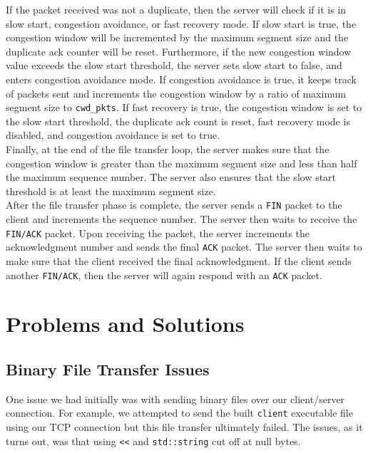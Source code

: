 \documentclass{article}
\begin{document}
\noindent
If the packet received was not a duplicate, then the server will check if it is in slow start, congestion avoidance, or fast recovery mode. If slow start is true, the congestion window will be incremented by the maximum segment size and the duplicate ack counter will be reset. Furthermore, if the new congestion window value exceeds the slow start threshold, the server sets slow start to false, and enters congestion avoidance mode. If congestion avoidance is true, it keeps track of packets sent and increments the congestion window by a ratio of maximum segment size to \texttt{cwd\_pkts}. If fast recovery is true, the congestion window is set to the slow start threshold, the duplicate ack count is reset, fast recovery mode is disabled, and congestion avoidance is set to true. \\

\noindent
Finally, at the end of the file transfer loop, the server makes sure that the congestion window is greater than the maximum segment size and less than half the maximum sequence number. The server also ensures that the slow start threshold is at least the maximum segment size. \\

\noindent
After the file transfer phase is complete, the server sends a \texttt{FIN} packet to the client and increments the sequence number. The server then waits to receive the \texttt{FIN/ACK} packet. Upon receiving the packet, the server increments the acknowledgment number and sends the final \texttt{ACK} packet. The server then waits to make sure that the client received the final acknowledgment. If the client sends another \texttt{FIN/ACK}, then the server will again respond with an \texttt{ACK} packet.

\section{Problems and Solutions}

\subsection{Binary File Transfer Issues}

One issue we had initially was with sending binary files over our client/server connection. For example, we attempted to send the built \texttt{client} executable file using our TCP connection but this file transfer ultimately failed. The issues, as it turns out, was that using \texttt{<<} and \texttt{std::string} cut off at null bytes.
\end{document}
